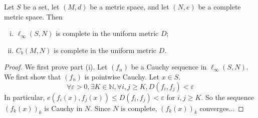 \begin{theorem}
	Let \( S \) be a set, let \( (M,d) \) be a metric space, and let \( (N,e) \) be a complete metric space.
	Then
	\begin{enumerate}[(i)]
		\item \( \ell_\infty(S,N) \) is complete in the uniform metric \( D \);
		\item \( C_b(M,N) \) is complete in the uniform metric \( D \).
	\end{enumerate}
\end{theorem}
\begin{proof}
	We first prove part (i).
	Let \( (f_n) \) be a Cauchy sequence in \( \ell_\infty(S, N) \).
	We first show that \( (f_n) \) is pointwise Cauchy.
	Let \( x \in S \).
	\[
		\forall \varepsilon > 0, \exists K \in \mathbb N, \forall i,j \geq K, D(f_i, f_j) < \varepsilon
	\]
	In particular, \( e(f_i(x), f_j(x)) \leq D(f_i,f_j) < \varepsilon \) for \( i,j \geq K \).
	So the sequence \( (f_k(x))_k \) is Cauchy in \( N \).
	Since \( N \) is complete, \( (f_k(x))_k \) converges...
\end{proof}
